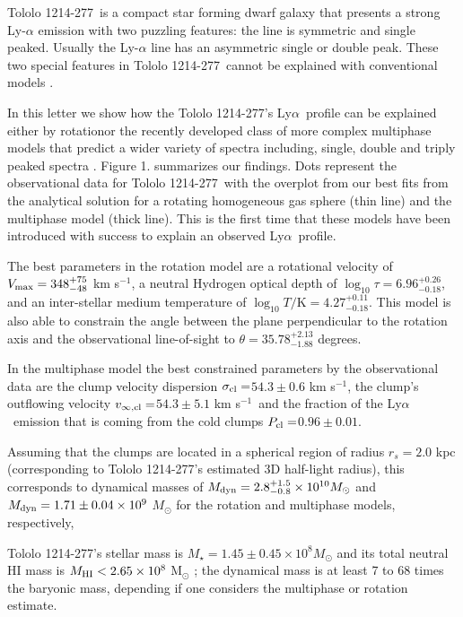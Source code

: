 \documentclass[a4paper, usenatbib, 12pt]{article}
\newcommand{\tol}{Tololo 1214-277}
\newcommand{\lya}{Ly$\alpha$}
\newcommand{\kms}{km s$^{-1}$}
\newcommand{\sigmaclump}{$54.3\pm 0.6$ km s$^{-1}$}
\newcommand{\inftyclump}{$54.3\pm 5.1$ km s$^{-1}$}
\newcommand{\probaclump}{$0.96\pm 0.01$}
\begin{document}
{\tol\ is a compact star forming dwarf galaxy that presents a
strong Ly-$\alpha$ emission \cite{Thuan97} with two puzzling 
features: the line is symmetric and single peaked.
Usually the Ly-$\alpha$ line has an asymmetric single or double peak. 
These two special features in \tol\ cannot be explained with
conventional models \cite{2006A&A...460..397V,2015ApJ...812..123G}.  

In this letter we show how the \tol's \lya\ profile can be explained
either by rotation\cite{GaravitoCamargo2014}or the recently developed
class of more complex 
multiphase models that predict a wider variety of spectra
including, single, double and triply peaked spectra \cite{Gronke2016}.  
Figure 1. summarizes our findings.
Dots represent the observational data for \tol\ with the
overplot from our best fits from the analytical solution for a
rotating homogeneous gas sphere (thin line) and the multiphase
model (thick line). 
This is the first time that these models have been introduced with
success to explain an observed \lya\ profile.   


The best parameters in the rotation model are a rotational velocity of 
$V_{\rm max}=348^{+75}_{-48}$ \kms, a neutral Hydrogen optical depth of 
$\log_{10}\tau=6.96^{+0.26}_{-0.18}$,  and an inter-stellar medium temperature of $\log_{10} T/\mathrm {K} = 4.27^{+0.11}_{-0.18}$.  
This model is also able to constrain the angle between the plane
perpendicular to the rotation axis and the observational line-of-sight
to $\theta = 35.78^{+2.13}_{-1.88}$ degrees.

In the multiphase model the best constrained parameters by the
observational data are the clump velocity dispersion
$\sigma_{\rm{cl}}=$\sigmaclump ,  the clump's outflowing velocity
$v_{\infty, \rm{cl}}=$\inftyclump\ and the fraction of the
\lya\ emission that is  coming from the cold clumps  $P_{\rm cl}=$\probaclump.


Assuming that the clumps are located in a spherical region of radius
$r_s=2.0$ kpc (corresponding to \tol's estimated 3D half-light
radius), 
this corresponds to dynamical masses of $M_{\rm dyn} =
2.8_{-0.8}^{+1.5}\times 10^{10} M_{\odot}$ and $M_{\rm
  dyn}=1.71\pm0.04 \times 10^{9}$ $M_{\odot}$ for the
rotation and multiphase models, respectively, 

\tol's stellar mass is  $M_{\star} = 1.45\pm0.45\times 10^{8}
M_{\odot}$   \cite{2014PASP..126.1079M} and its total neutral HI mass is $M_{\rm HI}<2.65\times 10^{8}$ M$_{\odot}$
\cite{pustilnikmartin07}; the dynamical mass is at
least 7 to 68 times the baryonic mass, depending if one
considers the multiphase or rotation estimate.

}
\end{document}
